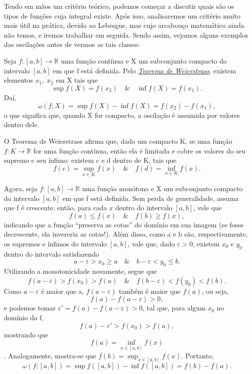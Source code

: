 \documentclass[../analysisII_notes.tex]{subfiles}
\begin{document}
Tendo em mãos um critério teórico, podemos começar a discutir quais são os tipos de funções cuja integral existe. Após isso, analisaremos um critério muito mais útil na prática, devido ao Lebesgue, mas cujo arcabouço matemático ainda não temos, e iremos trabalhar em seguida. Sendo assim, vejamos alguns exemplos das oscilações antes de vermos as tais classes:
\begin{example}
	Seja \(f:[a, b]\rightarrow \mathbb{R}\) uma função contínua e X um subconjunto compacto do intervalo \([a, b]\) em que f está definida. Pelo \hyperlink{weierstrass_theorem}{\textit{Teorema de Weierstrass}}, existem elementos \(x_{1},\; x_{2}\) em X tais que
	\[
		\sup_{}f(X) = f(x_{2}) \quad\&\quad \inf_{}f(X) = f(x_{1}).
	\]
	Daí,
	\[
		\omega (f; X) = \sup_{}f(X) - \inf_{}f(X) = f(x_{2})-f(x_{1}),
	\]
	o que significa que, quando X for compacto, a oscilação é assumida por valores dentro dele.
\end{example}
\begin{tcolorbox}[
		skin=enhanced,
		title=Lembrete!,
		after title={\hfill Teorema de Weierstrass},
		fonttitle=\bfseries,
		sharp corners=downhill,
		colframe=black,
		colbacktitle=yellow!75!white,
		colback=yellow!30,
		colbacklower=black,
		coltitle=black,
		drop large lifted shadow
	]
	O \hypertarget{weierstrass_theorem}{Teorema de Weierstrass} afirma que, dado um compacto K, se uma função \(f:K\rightarrow \mathbb{R}\) for uma função contínua, então ela é limitada e cobre os valores do seu supremo e seu ínfimo: existem c e d dentro de K, tais que
	\[
		f(c)=\sup_{x\in K}f(x)\quad\&\quad f(d)=\inf_{x\in K}f(x).
	\]
\end{tcolorbox}
\begin{example}
	Agora, seja \(f:[a, b]\rightarrow \mathbb{R}\) uma função monótona e X um subconjunto compacto do intervalo \([a, b]\) em que f está definida. Sem perda de generalidade, assuma que f é crescente; então, para cada \(x\) dentro do intervalo \([a, b]\), vale que
	\[
		f(a)\leq f(x) \quad\&\quad f(b)\geq f(x),
	\]
	indicando que a função ``preserva as cotas'' do domínio em sua imagem (se fosse decrescente, ela invereria as cotas!). Além disso, como a e b são, respectivamente, os supremos e ínfimos do intervalo \([a, b]\), vale que, dado \(\varepsilon > 0\), existem \(x_{0}\) e \(y_{0}\) dentro do intervalo satisfazendo
	\[
		a-\varepsilon > x_{0} \geq a \quad\&\quad b-\varepsilon < y_{0} \leq b.
	\]
	Utilizando a monotonicidade novamente, segue que
	\[
		f(a-\varepsilon )> f(x_{0}) > f(a) \quad\&\quad f(b-\varepsilon )< f(y_{0}) < f(b).
	\]
	Como \(a-\varepsilon \) é maior que a, \(f(a-\varepsilon )\) também é maior que \(f(a)\), ou seja,
	\[
		f(a)-f(a-\varepsilon ) > 0,
	\]
	e podemos tomar \(\varepsilon' = f(a)-f(a-\varepsilon ) > 0\), tal que, para algum \(x_{0}\) no domínio da f,
	\[
		f(a)-\varepsilon ' > f(x_{0}) > f(a),
	\]
	mostrando que
	\[
		f(a)=\inf_{x\in [a, b]}f(x)
	\]. Analogamente, mostra-se que \(f(b)=\sup_{x\in [a, b]}f(x)\). Portanto,
	\[
		\omega (f; [a, b])=\sup_{}f([a, b])-\inf_{}f([a, b]) = f(b)-f(a).
	\]
\end{example}
\end{document}
